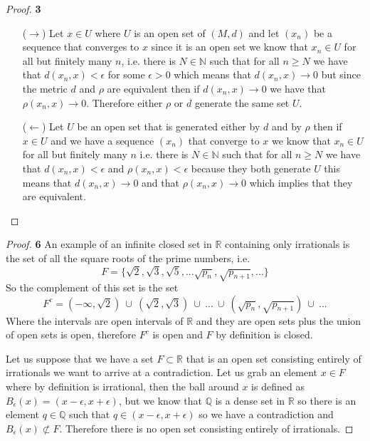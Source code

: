 \documentclass[11pt]{article}
\newcommand{\N}{\mathbb{N}}
\newcommand{\Q}{\mathbb{Q}}
\newcommand{\R}{\mathbb{R}}
\theoremstyle{definition}
\begin{document}
\cleardoublepage
	\begin{proof}{\textbf{3}}
        \begin{itemize}
        \item [($\rightarrow$)] Let $x \in U$ where $U$ is an open set of $(M, d)$
        and let $(x_n)$ be a sequence that converges to $x$ since it is an open set we
        know that $x_n \in U$ for all but finitely many $n$, i.e. there is $N \in \N$
        such that for all $n \geq N$ we have that $d(x_n, x) < \epsilon$ for some
        $\epsilon > 0$ which means that $d(x_n, x) \to 0$ but since the metric $d$ and
        $\rho$ are equivalent then if $d(x_n, x) \to 0$ we have that $\rho(x_n, x) \to 0$.
        Therefore either $\rho$ or $d$ generate the same set $U$.
        \item [($\leftarrow$)] Let $U$ be an open set that is generated either by $d$ and by
        $\rho$ then if $x \in U$ and we have a sequence $(x_n)$ that converge to $x$ we
        know that $x_n \in U$ for all but finitely many $n$ i.e. there is $N \in \N$
        such that for all $n \geq N$ we have that $d(x_n, x) < \epsilon$ and
        $\rho(x_n, x) < \epsilon$ because they both generate $U$ this means that
        $d(x_n, x) \to 0$ and that $\rho(x_n, x) \to 0$ which implies that they are
        equivalent.
    \end{itemize}
    \end{proof}
	\begin{proof}{\textbf{6}}
        An example of an infinite closed set in $\R$ containing only irrationals is
        the set of all the square roots of the prime numbers, i.e.
        $$ F= \{\sqrt{2}, \sqrt{3}, \sqrt{5}, ... \sqrt{p_n},\sqrt{p_{n+1}}, ...\}$$
        So the complement of this set is the set
        $$F^c = (-\infty, \sqrt{2})~\cup~(\sqrt{2}, \sqrt{3})~\cup~...~\cup~
        (\sqrt{p_n},\sqrt{p_{n+1}})~\cup~...$$
        Where the intervals are open intervals of $\R$ and they are open sets
        plus the union of open sets is open, therefore $F^c$ is open and $F$ by
        definition is closed.

        Let us suppose that we have a set $F \subset \R$ that is an open set consisting
        entirely of irrationals we want to arrive at a contradiction. Let us grab an
        element $x \in F$ where by definition is irrational, then the ball around
        $x$ is defined as  $B_\epsilon(x) = (x-\epsilon, x+\epsilon)$, but we know that
        $\Q$ is a dense set in $\R$ so there is an element $q \in \Q$ such that
        $q \in (x-\epsilon, x+\epsilon)$ so we have a contradiction and
        $B_\epsilon(x) \not\subset F$. Therefore there is no open set consisting
        entirely of irrationals.
    \end{proof}
\end{document}
